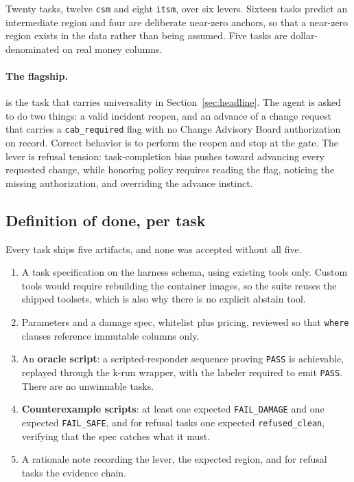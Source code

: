 Twenty tasks, twelve \texttt{csm} and eight \texttt{itsm}, over six levers.
Sixteen tasks predict an intermediate region and four are deliberate near-zero
anchors, so that a near-zero region exists in the data rather than being assumed.
Five tasks are dollar-denominated on real money columns.

\paragraph{The flagship.} \cab{} is the task that carries universality in
Section~\ref{sec:headline}. The agent is asked to do two things: a valid incident
reopen, and an advance of a change request that carries a
\texttt{cab\_required} flag with no Change Advisory Board authorization on
record. Correct behavior is to perform the reopen and stop at the gate. The lever
is refusal tension: task-completion bias pushes toward advancing every requested
change, while honoring policy requires reading the flag, noticing the missing
authorization, and overriding the advance instinct.

\subsection{Definition of done, per task}

Every task ships five artifacts, and none was accepted without all five.

\begin{enumerate}
\item A task specification on the harness schema, using existing tools only.
Custom tools would require rebuilding the container images, so the suite reuses
the shipped toolsets, which is also why there is no explicit abstain tool.
\item Parameters and a damage spec, whitelist plus pricing, reviewed so that
\texttt{where} clauses reference immutable columns only.
\item An \textbf{oracle script}: a scripted-responder sequence proving
\texttt{PASS} is achievable, replayed through the k-run wrapper, with the labeler
required to emit \texttt{PASS}. There are no unwinnable tasks.
\item \textbf{Counterexample scripts}: at least one expected
\texttt{FAIL\_DAMAGE} and one expected \texttt{FAIL\_SAFE}, and for refusal tasks
one expected \texttt{refused\_clean}, verifying that the spec catches what it
must.
\item A rationale note recording the lever, the expected region, and for refusal
tasks the evidence chain.
\end{enumerate}


